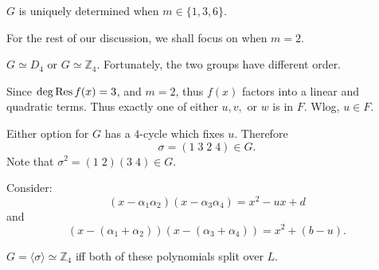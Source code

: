 \documentclass[notoc,notitlepage,nobib]{tufte-book}
\begin{document}
\begin{remark}
  $G$ is uniquely determined when $m \in \{ 1, 3, 6 \}$.
\end{remark}

For the rest of our discussion, we shall focus on when $m = 2$.

 $G \simeq D_4$ or $G \simeq \mathbb{Z}_4$.
Fortunately, the two groups have different order.

Since $\deg \operatorname{Res} f(x) = 3$, and $m = 2$, thus $f(x)$ factors into a linear and
quadratic terms. Thus exactly one of either $u, v,$ or $w$ is in $F$. Wlog, $u
\in F$.

Either option for $G$ has a $4$-cycle which fixes $u$. Therefore
\begin{equation*}
  \sigma = (1 \; 3 \; 2 \; 4) \in G.
\end{equation*}
Note that $\sigma^2 = (1 \; 2)(3 \; 4) \in G$.

Consider:
\begin{equation*}
  (x - \alpha_1 \alpha_2)(x - \alpha_3 \alpha_4) = x^2 - ux + d
\end{equation*}
and
\begin{equation*}
  (x - ( \alpha_1 + \alpha_2 ))(x - (\alpha_3 + \alpha_4)) = x^2 + (b - u).
\end{equation*}

 $G = \langle \sigma \rangle \simeq \mathbb{Z}_4$ iff both of
these polynomials split over $L$.
\end{document}
